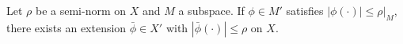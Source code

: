 Let $\rho$ be a semi-norm on $X$ and $M$ a subspace. If $\phi \in M'$ satisfies $|\phi(\cdot)| \leqslant \rho|_M$, there exists an extension $\bar{\phi} \in X'$ with $|\bar{\phi}(\cdot)| \leqslant \rho$ on $X$.
